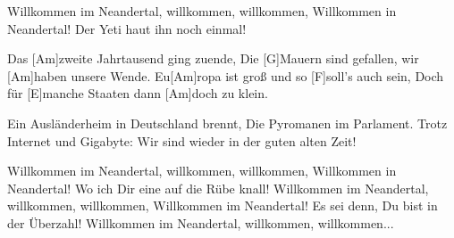 \begin{guitar}
	\begin{highlightbar}
		Willkommen im Neandertal, willkommen, willkommen,
		Willkommen in Neandertal! Der Yeti haut ihn noch einmal!
	\end{highlightbar}
	
	\songsection{Strophe 3}
	Das [Am]zweite Jahrtausend ging zuende,
	Die [G]Mauern sind gefallen, wir [Am]haben unsere Wende.
	Eu[Am]ropa ist groß und so [F]soll’s auch sein,
	Doch für [E]manche Staaten dann [Am]doch zu klein.
	
	Ein Ausländerheim in Deutschland brennt,
	Die Pyromanen im Parlament.
	Trotz Internet und Gigabyte: 
	Wir sind wieder in der guten alten Zeit!
	
	\begin{highlightbar}
		\songsection{Refrain}
		Willkommen im Neandertal, willkommen, willkommen,
		Willkommen in Neandertal! Wo ich Dir eine auf die Rübe knall!
		Willkommen im Neandertal, willkommen, willkommen,
		Willkommen im Neandertal! Es sei denn, Du bist in der Überzahl!
		Willkommen im Neandertal, willkommen, willkommen...
	\end{highlightbar}
\end{guitar}
